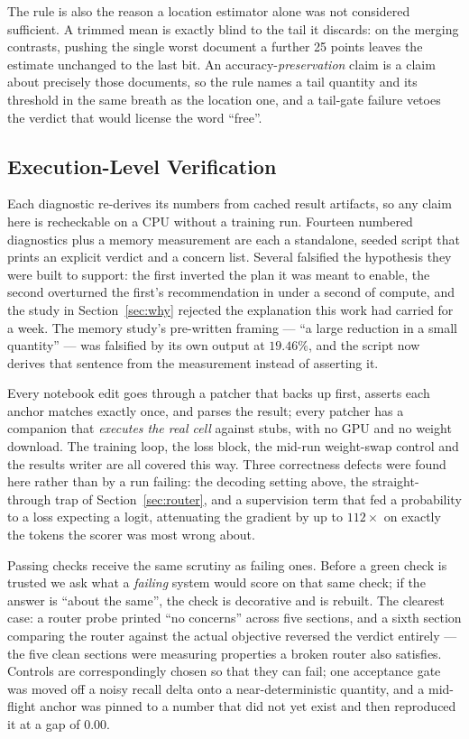 \documentclass[conference]{IEEEtran}
\begin{document}
The rule is also the reason a location estimator alone was not considered sufficient. A
trimmed mean is exactly blind to the tail it discards: on the merging contrasts, pushing the
single worst document a further 25 points leaves the estimate unchanged to the last bit. An
accuracy-\emph{preservation} claim is a claim about precisely those documents, so the rule
names a tail quantity and its threshold in the same breath as the location one, and a
tail-gate failure vetoes the verdict that would license the word ``free''.

\subsection{Execution-Level Verification}
\label{sec:verification}

Each diagnostic re-derives its numbers from cached result artifacts, so any claim here is
recheckable on a CPU without a training run. Fourteen numbered diagnostics plus a memory
measurement are each a standalone, seeded script that prints an explicit verdict and a
concern list. Several falsified the hypothesis they were built to support: the first inverted
the plan it was meant to enable, the second overturned the first's recommendation in under a
second of compute, and the study in Section~\ref{sec:why} rejected the explanation this work
had carried for a week. The memory study's pre-written framing --- ``a large reduction in a
small quantity'' --- was falsified by its own output at $19.46\%$, and the script now derives
that sentence from the measurement instead of asserting it.

Every notebook edit goes through a patcher that backs up first, asserts each anchor matches
exactly once, and parses the result; every patcher has a companion that \emph{executes the
real cell} against stubs, with no GPU and no weight download. The training loop, the loss
block, the mid-run weight-swap control and the results writer are all covered this way. Three
correctness defects were found here rather than by a run failing: the decoding setting above,
the straight-through trap of Section~\ref{sec:router}, and a supervision term that fed a
probability to a loss expecting a logit, attenuating the gradient by up to $112\times$ on
exactly the tokens the scorer was most wrong about.

Passing checks receive the same scrutiny as failing ones. Before a green check is trusted we
ask what a \emph{failing} system would score on that same check; if the answer is ``about the
same'', the check is decorative and is rebuilt. The clearest case: a router probe printed ``no
concerns'' across five sections, and a sixth section comparing the router against the actual
objective reversed the verdict entirely --- the five clean sections were measuring properties
a broken router also satisfies. Controls are correspondingly chosen so that they can fail;
one acceptance gate was moved off a noisy recall delta onto a near-deterministic quantity,
and a mid-flight anchor was pinned to a number that did not yet exist and then reproduced it
at a gap of $0.00$.
\end{document}
